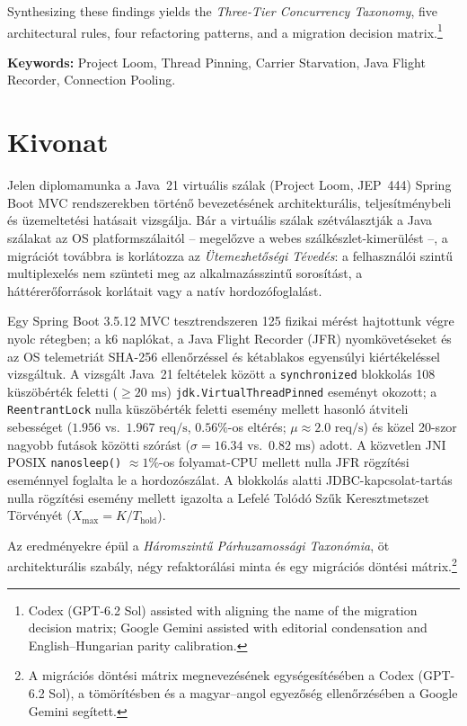 \documentclass{elteikthesis}
\begin{document}
Synthesizing these findings yields the \emph{Three-Tier Concurrency Taxonomy}, five architectural rules, four refactoring patterns, and a migration decision matrix.\footnote{Codex (GPT-6.2 Sol) assisted with aligning the name of the migration decision matrix; Google Gemini assisted with editorial condensation and English--Hungarian parity calibration.}

\bigskip
\noindent\textbf{Keywords:} Project Loom, Thread Pinning, Carrier Starvation, Java Flight Recorder, Connection Pooling.

\cleardoublepage
\chapter*{Kivonat}
Jelen diplomamunka a Java~21 virtuális szálak (Project Loom, JEP~444) Spring Boot MVC rendszerekben történő bevezetésének architekturális, teljesítménybeli és üzemeltetési hatásait vizsgálja. Bár a virtuális szálak szétválasztják a Java szálakat az OS platformszálaitól -- megelőzve a webes szálkészlet-kimerülést --, a migrációt továbbra is korlátozza az \emph{Ütemezhetőségi Tévedés}: a felhasználói szintű multiplexelés nem szünteti meg az alkalmazásszintű sorosítást, a háttérerőforrások korlátait vagy a natív hordozófoglalást.

Egy Spring Boot 3.5.12 MVC tesztrendszeren 125 fizikai mérést hajtottunk végre nyolc rétegben; a k6 naplókat, a Java Flight Recorder (JFR) nyomkövetéseket és az OS telemetriát SHA-256 ellenőrzéssel és kétablakos egyensúlyi kiértékeléssel vizsgáltuk. A vizsgált Java~21 feltételek között a \texttt{synchronized} blokkolás 108 küszöbérték feletti ($\ge 20\text{ ms}$) \texttt{jdk.VirtualThreadPinned} eseményt okozott; a \texttt{ReentrantLock} nulla küszöbérték feletti esemény mellett hasonló átviteli sebességet ($1.956$ vs.\ $1.967\text{ req/s}$, $0.56\%$-os eltérés; $\mu \approx 2.0\text{ req/s}$) és közel 20-szor nagyobb futások közötti szórást ($\sigma = 16.34$ vs.\ $0.82\text{ ms}$) adott. A közvetlen JNI POSIX \texttt{nanosleep()} $\approx 1\%$-os folyamat-CPU mellett nulla JFR rögzítési eseménnyel foglalta le a hordozószálat. A blokkolás alatti JDBC-kapcsolat-tartás nulla rögzítési esemény mellett igazolta a Lefelé Tolódó Szűk Keresztmetszet Törvényét ($X_{\text{max}} = K/T_{\text{hold}}$).

Az eredményekre épül a \emph{Háromszintű Párhuzamossági Taxonómia}, öt architekturális szabály, négy refaktorálási minta és egy migrációs döntési mátrix.\footnote{A migrációs döntési mátrix megnevezésének egységesítésében a Codex (GPT-6.2 Sol), a tömörítésben és a magyar--angol egyezőség ellenőrzésében a Google Gemini segített.}
\end{document}
